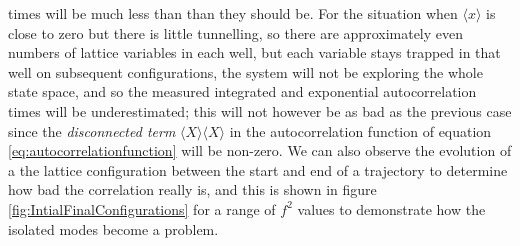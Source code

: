 \documentclass[12pt]{article}
\begin{document}
times will be much less than than they should be. For the situation when $\langle x \rangle$ is close to zero but there is little tunnelling, so there are approximately even numbers of lattice variables in each well, but each variable stays trapped in that well on subsequent configurations, the system will not be exploring the whole state space, and so the measured integrated and exponential autocorrelation times will be underestimated; this will not however be as bad as the previous case since the \textit{disconnected term} $\langle X\rangle\langle X\rangle$ in the autocorrelation function of equation \ref{eq:autocorrelationfunction} will be non-zero.  We can also observe the evolution of a the lattice configuration between the start and end of a trajectory to determine how bad the correlation really is, and this is shown in figure \ref{fig:IntialFinalConfigurations} for a range of $f^2$ values to demonstrate how the isolated modes become a problem.
\end{document}
